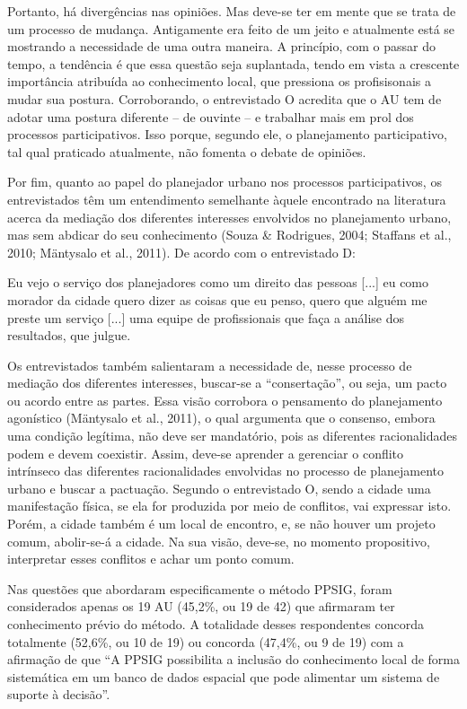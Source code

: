 \documentclass{article}
\begin{document}
Portanto, há divergências nas opiniões. Mas deve-se ter em mente que se trata de
um processo de mudança. Antigamente era feito de um jeito e atualmente está se
mostrando a necessidade de uma outra maneira. A princípio, com o passar do
tempo, a tendência é que essa questão seja suplantada, tendo em vista a
crescente importância atribuída ao conhecimento local, que pressiona os
profisisonais a mudar sua postura. Corroborando, o entrevistado O acredita que o
AU tem de adotar uma postura diferente – de ouvinte – e trabalhar mais em prol
dos processos participativos. Isso porque, segundo ele, o planejamento
participativo, tal qual praticado atualmente, não fomenta o debate de
opiniões.

Por fim, quanto ao papel do planejador urbano nos processos participativos, os
entrevistados têm um entendimento semelhante àquele encontrado na literatura
acerca da mediação dos diferentes interesses envolvidos no planejamento urbano,
mas sem abdicar do seu conhecimento (Souza
\& Rodrigues, 2004; Staffans et
al., 2010; Mäntysalo et al.,
2011). De acordo com o entrevistado D:

Eu vejo o serviço dos planejadores como um direito das pessoas
[...] eu como morador da cidade quero dizer as coisas
que eu penso, quero que alguém me preste um serviço [...]
uma equipe de profissionais que faça a análise dos resultados, que
julgue.

Os entrevistados também salientaram a necessidade de, nesse processo de mediação
dos diferentes interesses, buscar-se a “consertação”, ou seja, um pacto ou
acordo entre as partes. Essa visão corrobora o pensamento do planejamento
agonístico (Mäntysalo et al., 2011), o
qual argumenta que o consenso, embora uma condição legítima, não deve ser
mandatório, pois as diferentes racionalidades podem e devem coexistir. Assim,
deve-se aprender a gerenciar o conflito intrínseco das diferentes racionalidades
envolvidas no processo de planejamento urbano e buscar a pactuação. Segundo o
entrevistado O, sendo a cidade uma manifestação física, se ela for produzida por
meio de conflitos, vai expressar isto. Porém, a cidade também é um local de
encontro, e, se não houver um projeto comum, abolir-se-á a cidade. Na sua visão,
deve-se, no momento propositivo, interpretar esses conflitos e achar um ponto
comum.

Nas questões que abordaram especificamente o método PPSIG, foram considerados
apenas os 19 AU (45,2\%, ou 19 de 42) que afirmaram ter conhecimento prévio do
método. A totalidade desses respondentes concorda totalmente (52,6\%, ou 10 de
19) ou concorda (47,4\%, ou 9 de 19) com a afirmação de que “A PPSIG
possibilita a inclusão do conhecimento local de forma sistemática em um
banco de dados espacial que pode alimentar um sistema de suporte à
decisão”.
\end{document}
